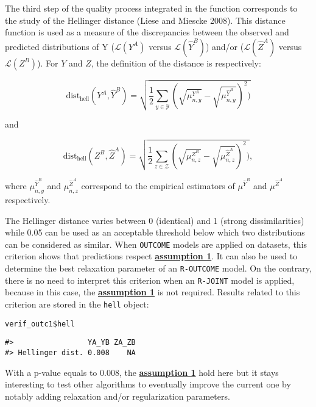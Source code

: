 The third step of the quality process integrated in the function corresponds to the study of the Hellinger distance (Liese and Miescke 2008). This distance function is used as a measure of the discrepancies between the observed and predicted distributions of Y (\(\mathcal{L}(Y^A)\) versus \(\mathcal{L}(\widehat{Y}^B)\)) and/or (\(\mathcal{L}(\widehat{Z}^A)\) versus \(\mathcal{L}(Z^B)\)). For \(Y\) and \(Z\), the definition of the distance is respectively:

\[
\text{dist}_{\text{hell}} (Y^A,\widehat{Y}^B)= \sqrt{\frac{1}{2} \sum_{y\in \mathcal{Y}}\left(\sqrt{\mu_{n,y}^{Y^A}}- \sqrt{\mu_{n,y}^{\widehat{Y}^B}}\right)^2 )}
\]

and

\[
\text{dist}_{\text{hell}} (Z^B,\widehat{Z}^A)= \sqrt{\frac{1}{2} \sum_{z\in \mathcal{Z}}\left(\sqrt{\mu_{n,z}^{Z^B}}- \sqrt{\mu_{n,z}^{\widehat{Z}^A}}\right)^2 )},
\]

where \(\mu_{n,y}^{\widehat{Y}^B}\) and \(\mu_{n,z}^{\widehat{Z}^A}\) correspond to the empirical estimators of \(\mu^{\widehat{Y}^B}\) and \(\mu^{\widehat{Z}^A}\) respectively.

The Hellinger distance varies between 0 (identical) and 1 (strong dissimilarities) while 0.05 can be used as an acceptable threshold below which two distributions can be considered as similar. When \texttt{OUTCOME} models are applied on datasets, this criterion shows that predictions respect \protect\hyperlink{optt}{\textbf{assumption 1}}. It can also be used to determine the best relaxation parameter of an \texttt{R-OUTCOME} model. On the contrary, there is no need to interpret this criterion when an \texttt{R-JOINT} model is applied, because in this case, the \protect\hyperlink{optt}{\textbf{assumption 1}} is not required. Results related to this criterion are stored in the \texttt{hell} object:

\begin{verbatim}
verif_outc1$hell
\end{verbatim}

\begin{verbatim}
#>                 YA_YB ZA_ZB
#> Hellinger dist. 0.008    NA
\end{verbatim}

With a p-value equals to \(0.008\), the \protect\hyperlink{optt}{\textbf{assumption 1}} hold here but it stays interesting to test other algorithms to eventually improve the current one by notably adding relaxation and/or regularization parameters.


